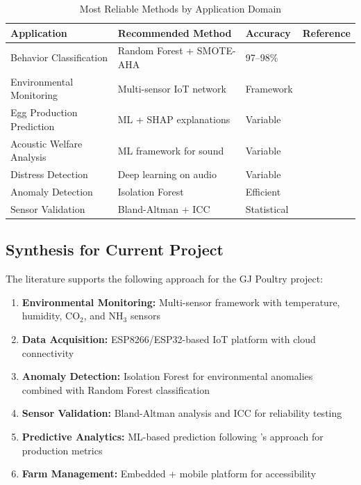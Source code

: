 \documentclass[../main.tex]{subfiles}
\begin{document}
\begin{table}[h!]
\centering
\caption{Most Reliable Methods by Application Domain}
\label{tab:reliable_methods}
\begin{tabular}{p{3.5cm}p{4.5cm}p{2cm}p{4cm}}
\hline
\textbf{Application} & \textbf{Recommended Method} & \textbf{Accuracy} & \textbf{Reference} \\
\hline
Behavior Classification & Random Forest + SMOTE-AHA & 97--98\% & \cite{ahmed2023smart} \\
\hline
Environmental Monitoring & Multi-sensor IoT network & Framework & \cite{lashari2023internet, chang2023iot} \\
\hline
Egg Production Prediction & ML + SHAP explanations & Variable & \cite{ji2025egg} \\
\hline
Acoustic Welfare Analysis & ML framework for sound & Variable & \cite{manikandan2025acoustic} \\
\hline
Distress Detection & Deep learning on audio & Variable & \cite{mao2022distress} \\
\hline
Anomaly Detection & Isolation Forest & Efficient & \cite{liu2008iforest} \\
\hline
Sensor Validation & Bland-Altman + ICC & Statistical & \cite{bland1986agreement, koo2016icc} \\
\hline
\end{tabular}
\end{table}

\subsection{Synthesis for Current Project}

The literature supports the following approach for the GJ Poultry project:

\begin{enumerate}
    \item \textbf{Environmental Monitoring:} Multi-sensor framework with temperature, humidity, CO$_2$, and NH$_3$ sensors \cite{lashari2023internet, chang2023iot, godinho2025wireless}

    \item \textbf{Data Acquisition:} ESP8266/ESP32-based IoT platform with cloud connectivity \cite{kamor2024poultry, yourstory2018poultrymon}

    \item \textbf{Anomaly Detection:} Isolation Forest for environmental anomalies \cite{liu2008iforest} combined with Random Forest classification \cite{breiman2001rf}

    \item \textbf{Sensor Validation:} Bland-Altman analysis and ICC for reliability testing \cite{bland1986agreement, koo2016icc}

    \item \textbf{Predictive Analytics:} ML-based prediction following \cite{ji2025egg}'s approach for production metrics

    \item \textbf{Farm Management:} Embedded + mobile platform for accessibility \cite{karun2024iot}
\end{enumerate}
\end{document}
